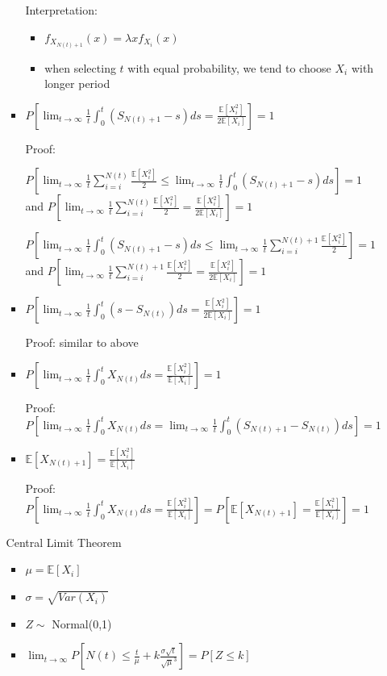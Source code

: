 \documentclass[a4paper]{article}
\begin{document}
\begin{itemize}
\begin{itemize}
\begin{itemize}
                        Interpretation:
                        \begin{itemize}
                            \item $f_{X_{N(t)+1}}(x) = \lambda x f_{X_i}(x)$
                            \item when selecting $t$ with equal probability, we tend to choose $X_i$ with longer period
                        \end{itemize}
                    \item $P[\lim_{t \rightarrow \infty} \frac{1}{t} \int_0^t (S_{N(t) + 1} - s) ds = \frac{\mathbb{E}[X_i^2]}{2\mathbb{E}[X_i]}] = 1$

                        Proof:

                        $P[\lim_{t \rightarrow \infty} \frac{1}{t} \sum_{i = i}^{N(t)} \frac{\mathbb{E}[X_i^2]}{2} \leq \lim_{t \rightarrow \infty} \frac{1}{t} \int_0^t (S_{N(t) + 1} - s) ds] = 1$ and $P[\lim_{t \rightarrow \infty} \frac{1}{t} \sum_{i = i}^{N(t)} \frac{\mathbb{E}[X_i^2]}{2} = \frac{\mathbb{E}[X_i^2]}{2\mathbb{E}[X_i]}] = 1$

                        $P[\lim_{t \rightarrow \infty} \frac{1}{t} \int_0^t (S_{N(t) + 1} - s) ds \leq \lim_{t \rightarrow \infty} \frac{1}{t} \sum_{i = i}^{N(t) + 1} \frac{\mathbb{E}[X_i^2]}{2}] = 1$ and $P[\lim_{t \rightarrow \infty} \frac{1}{t} \sum_{i = i}^{N(t) + 1} \frac{\mathbb{E}[X_i^2]}{2} = \frac{\mathbb{E}[X_i^2]}{2\mathbb{E}[X_i]}] = 1$
                    \item $P[\lim_{t \rightarrow \infty} \frac{1}{t} \int_0^t (s - S_{N(t)}) ds = \frac{\mathbb{E}[X_i^2]}{2\mathbb{E}[X_i]}] = 1$

                        Proof: similar to above
                    \item $P[\lim_{t \rightarrow \infty} \frac{1}{t} \int_0^t X_{N(t)} ds = \frac{\mathbb{E}[X_i^2]}{\mathbb{E}[X_i]}] = 1$

                        Proof: $P[\lim_{t \rightarrow \infty} \frac{1}{t} \int_0^t X_{N(t)} ds = \lim_{t \rightarrow \infty} \frac{1}{t} \int_0^t (S_{N(t) + 1} - S_{N(t)}) ds] = 1$
                    \item $\mathbb{E}[X_{N(t) + 1}] = \frac{\mathbb{E}[X_i^2]}{\mathbb{E}[X_i]}$

                        Proof: $P[\lim_{t \rightarrow \infty} \frac{1}{t} \int_0^t X_{N(t)} ds = \frac{\mathbb{E}[X_i^2]}{\mathbb{E}[X_i]}] = P[\mathbb{E}[X_{N(t) + 1}] = \frac{\mathbb{E}[X_i^2]}{\mathbb{E}[X_i]}] = 1$
                \end{itemize}
                Central Limit Theorem
                \begin{itemize}
                    \item $\mu = \mathbb{E}[X_i]$
                    \item $\sigma = \sqrt{\mathit{Var}(X_i)}$
                    \item $Z \sim$ Normal(0,1)
                    \item $\lim_{t \rightarrow \infty} P[N(t) \leq \frac{t}{\mu} + k \frac{\sigma \sqrt{t}}{\sqrt{\mu}^3}] = P[Z \leq k]$


\end{itemize}
\end{itemize}
\end{itemize}
\end{document}
